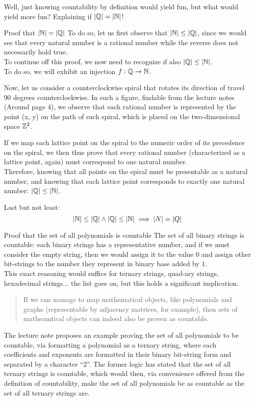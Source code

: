 Well, just knowing countability by definition would yield fun, but what would yield more fun? Explaining if $|\mathbb{Q}| = |\mathbb{N}|$!
\begin{ln-think}{Proof that $|\mathbb{N}| = |\mathbb{Q}|$}{}
    To do so, let us first observe that $|\mathbb{N}| \leq |\mathbb{Q}|$, since we would see that every natural number is a rational number while the reverse does not necessarily hold true. \\
    
    To continue off this proof, we now need to recognize if also $|\mathbb{Q}| \leq |\mathbb{N}|$. \\
    To do so, we will exhibit an injection $f: \mathbb{Q} \rightarrow \mathbb{N}$.
    
    Now, let us consider a counterclockwise spiral that rotates its direction of travel 90 degrees counterclockwise. In such a figure, findable from the lecture notes (Around page 4), we observe that each rational number is represented by the point (x, y) on the path of such spiral, which is placed on the two-dimensional space $\mathbb{Z}^2$.
    
    If we map each lattice point on the spiral to the numeric order of its precedence on the spiral, we then thus prove that every rational number (characterized as a lattice point, again) must correspond to one natural number. \\
    Therefore, knowing that all points on the spiral must be presentable as a natural number, and knowing that each lattice point corresponds to exactly one natural number: $|\mathbb{Q}| \leq |\mathbb{N}|$.

    Last but not least:
    \[
        |\mathbb{N}| \leq |\mathbb{Q}| \land |\mathbb{Q}| \leq |\mathbb{N}| \implies |N| = |Q|
    \]
\end{ln-think}

\begin{ln-think}{Proof that the set of all polynomials is countable}{}
    The set of all binary strings is countable: each binary strings has a representative number, and if we must consider the empty string, then we would assign it to the value $0$ and assign other bit-strings to the number they represent in binary base added by $1$. \\
    This exact reasoning would suffice for ternary strings, quad-ary strings, hexadecimal strings... the list goes on, but this holds a significant implication.
    \begin{quote}
        If we can manage to map mathematical objects, like polynomials and graphs (representable by adjacency matrices, for example), then sets of matheamtical objects can indeed also be proven as countable.
    \end{quote}
    The lecture note proposes an example proving the set of all polynomials to be countable, via formatting a polynomial as a ternary string, where each coefficients and exponents are formatted in their binary bit-string form and separated by a character ``2''.
    The former logic has stated that the set of all ternary strings is countable, which would then, via convenience offered from the definition of countability, make the set of all polynomials be as countable as the set of all ternary strings are.
\end{ln-think}

